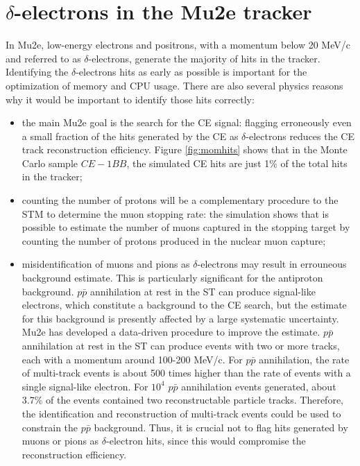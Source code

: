\section{$\delta$-electrons in the Mu2e tracker}\label{trackerdeltas}

In Mu2e, low-energy electrons 
and positrons, with a momentum below 20 MeV/c and 
referred to as $\delta$-electrons, 
generate the majority of hits in the tracker. 
Identifying the $\delta$-electrons hits as early 
as possible is important for the optimization of memory 
and CPU usage. There are also several physics 
reasons why it would be important to identify 
those hits correctly:
\begin{itemize}
    \item the main Mu2e goal is the search for the 
    CE signal: flagging erroneously even a small 
    fraction of the hits generated by the 
    CE as $\delta$-electrons reduces the CE track reconstruction efficiency. 
    Figure \ref{fig:momhits} shows that in the 
    Monte Carlo sample $CE-1BB$, the simulated CE 
    hits are just 1\% of the total hits in the tracker;
    \item counting the number of protons 
    will be a complementary procedure to the 
    STM to determine the muon stopping rate: 
    the simulation shows that is possible to 
    estimate the number of muons captured in 
    the stopping target by counting the number 
    of protons produced in the nuclear muon 
    capture;
    \item misidentification of muons 
      and pions as $\delta$-electrons 
    may result in errouneous background estimate. 
    This is particularly significant for the 
    antiproton background.
    $p\bar{p}$ annihilation at rest in the ST 
    can produce signal-like electrons, which 
    constitute a background to the CE search, 
    but the estimate for this background is 
    presently affected by a large systematic 
    uncertainty. Mu2e has developed a data-driven 
    procedure to improve the estimate.
    $p\bar{p}$ annihilation at rest in the ST 
    can produce events with two or more tracks, 
    each with a momentum around 100-200 MeV/c. 
    For $p\bar{p}$ annihilation, 
    the rate of multi-track events 
    is about 500 times higher 
    than the rate of events with a single 
    signal-like electron. 
    For $10^4$ $p\bar{p}$ annihilation events 
    generated, about 3.7\% of 
    the events contained two reconstructable 
    particle tracks. Therefore, 
    the identification and reconstruction of 
    multi-track events could be 
    used to constrain the $p\bar{p}$ background. 
    Thus, it is crucial not to flag hits 
    generated by muons or pions as $\delta$-electron 
    hits, since this would compromise the 
    reconstruction efficiency. 
\end{itemize}
